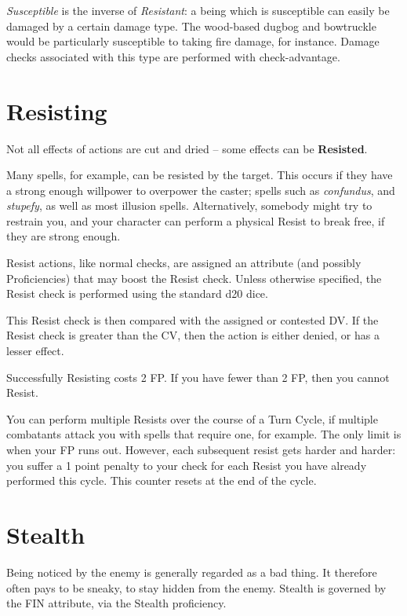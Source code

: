 {\it Susceptible} is the inverse of {\it Resistant}: a being which is susceptible can easily be damaged by a certain damage type. The wood-based dugbog and bowtruckle would be particularly susceptible to taking fire damage, for instance. Damage checks associated with this type are performed with check-advantage. 

\section{Resisting}

Not all effects of actions are cut and dried -- some effects can be {\bf Resisted}. 

Many spells, for example, can be resisted by the target. This occurs if they have a strong enough willpower to overpower the caster; spells such as {\it confundus}, and {\it stupefy}, as well as most illusion spells. Alternatively, somebody might try to restrain you, and your character can perform a physical Resist to break free, if they are strong enough. 

Resist actions, like normal checks, are assigned an attribute (and possibly Proficiencies) that may boost the Resist check. Unless otherwise specified, the Resist check is performed using the standard d20 dice. 

This Resist check is then compared with the assigned or contested DV. If the Resist check is greater than the CV, then the action is either denied, or has a lesser effect. 

Successfully Resisting costs 2 FP. If you have fewer than 2 FP, then you cannot Resist.

You can perform multiple Resists over the course of a Turn Cycle, if multiple combatants attack you with spells that require one, for example. The only limit is when your FP runs out. However, each subsequent resist gets harder and harder: you suffer a 1 point penalty to your check for each Resist you have already performed this cycle. This counter resets at the end of the cycle.

\section{Stealth} \label{S:Stealth}

Being noticed by the enemy is generally regarded as a bad thing. It therefore often pays to be sneaky, to stay hidden from the enemy. Stealth is governed by the FIN attribute, via the Stealth proficiency. 

